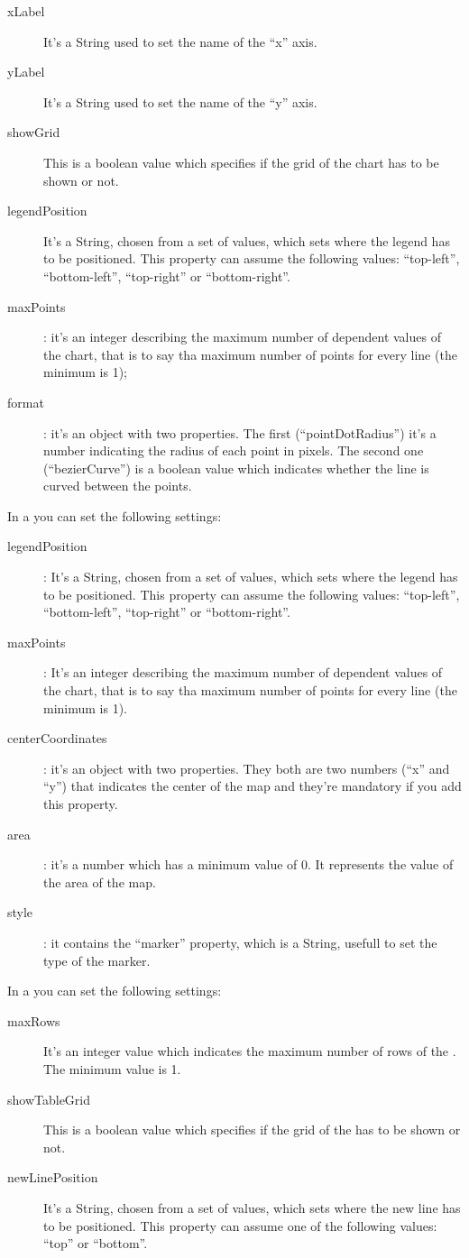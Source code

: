 				\begin{description}
					\item[xLabel] It's a String used to set the name of the “x” axis.
					\item[yLabel] It's a String used to set the name of the “y” axis.
					\item[showGrid] This is a boolean value which specifies if the grid of the chart has to be shown or not.
					\item[legendPosition] It's a String, chosen from a set of values, which sets where the legend has to be positioned. This property can assume the following values: “top-left”, “bottom-left”, “top-right” or “bottom-right”.
					\item[maxPoints]: it's an integer describing the maximum number of dependent values of the chart, that is to say tha maximum number of points for every line (the minimum is 1);
					\item[format]: it's an object with two properties. The first (“pointDotRadius”) it's a number indicating the radius of each point in pixels. The second one (“bezierCurve”) is a boolean value which indicates whether the line is curved between the points.
				\end{description}
				In a  you can set the following settings:
				\begin{description}
					\item[legendPosition]: It's a String, chosen from a set of values, which sets where the legend has to be positioned. This property can assume the following values: “top-left”, “bottom-left”, “top-right” or “bottom-right”.
					\item[maxPoints]: It's an integer describing the maximum number of dependent values of the chart, that is to say tha maximum number of points for every line (the minimum is 1).
					\item[centerCoordinates]: it's an object with two properties. They both are two numbers (“x” and “y”) that indicates the center of the map and they're mandatory if you add this property.
					\item[area]: it's a number which has a minimum value of 0. It represents the value of the area of the map.
					\item[style]: it contains the “marker” property, which is a String, usefull to set the type of the marker.
				\end{description}
				In a  you can set the following settings:
				\begin{description}
					\item[maxRows] It's an integer value which indicates the maximum number of rows of the . The minimum value is 1.
					\item[showTableGrid] This is a boolean value which specifies if the grid of the  has to be shown or not.
					\item[newLinePosition] It's a String, chosen from a set of values, which sets where the new line has to be positioned. This property can assume one of the following values: “top” or “bottom”.
				\end{description}

